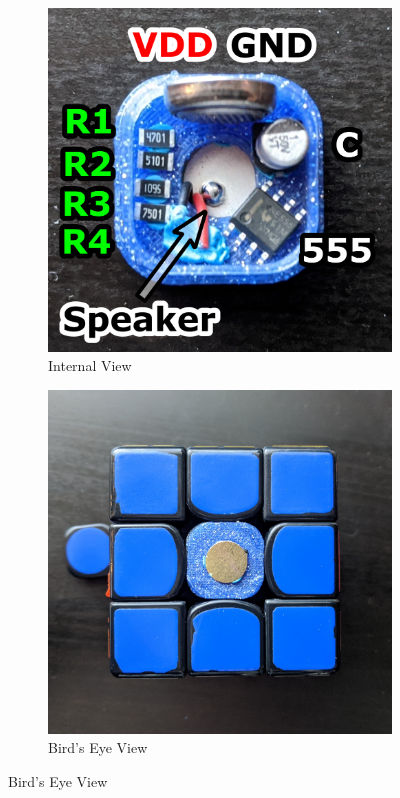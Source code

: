 \begin{figure}[h]
    \centering
    \caption{Transmitter Circuit Inside a Custom Gans 356 Centercap}
    \label{fig:core-placement}
    \begin{subfigure}{.30\textwidth}
        \centering
        \caption{Internal View}
        \label{fig:core-circuit}
        \includegraphics[width=\linewidth]{Figures/6 PCB Design/core_labelled.png}
    \end{subfigure}
    \begin{subfigure}{.30\textwidth}
        \centering
        \caption{Bird's Eye View}
        \label{fig:core-placement-birds-eye}
        \includegraphics[width=\linewidth]{Figures/6 PCB Design/core_placement_birds_eye_square.jpg}

\end{subfigure}
\end{figure}
